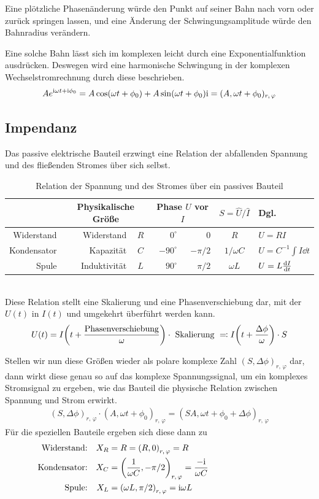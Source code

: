 Eine plötzliche Phasenänderung würde den Punkt auf seiner Bahn nach vorn oder zurück springen lassen, und eine Änderung der Schwingungsamplitude würde den Bahnradius verändern.

Eine solche Bahn lässt sich im komplexen leicht durch eine Exponentialfunktion
ausdrücken. Deswegen wird eine harmonische Schwingung in der komplexen Wechselstromrechnung durch diese beschrieben.
$$A e^{\mathrm{i} \omega t + \mathrm{i} \phi_0} = A\cos(\omega t + \phi_0) + A\sin(\omega t + \phi_0)\mathrm{i} = (A,\omega t + \phi_0)_{r,\,\varphi}$$

\subsection{Impendanz}
Das passive elektrische Bauteil erzwingt eine Relation der abfallenden Spannung und des fließenden Stromes über sich selbst.
\begin{table}[h]
    \centering
    \begin{tabular}{rrcrrcl}
    \toprule 
     & \multicolumn{2}{c}{Physikalische Größe} & \multicolumn{2}{c}{Phase $U$ vor $I$} & $S = \hat{U}/\hat{I}$ & Dgl.\\
    \midrule
    Widerstand  & Widerstand    & $R$ & $0^\circ$   & $0$      & $R$              & $U = RI$ \\
    Kondensator & Kapazität     & $C$ & $-90^\circ$ & $-\pi/2$ & $1/\omega C$     & $U = C^{-1} \int I \dd{t}$ \\
    Spule       & Induktivität  & $L$ & $90^\circ$  & $\pi/2$  & $\omega L$       & $U = L \dv{I}{t}$ \\
    \bottomrule
    \end{tabular}
    \caption{Relation der Spannung und des Stromes über ein passives Bauteil}
\end{table}\\ 
Diese Relation stellt eine Skalierung und eine Phasenverschiebung dar, mit der $U(t)$ in $I(t)$ 
und umgekehrt überführt werden kann.
$$U(t) = I\qty(t + \frac{\text{Phasenverschiebung}}{\omega}) \cdot \text{ Skalierung } \eqqcolon I\qty(t + \frac{\Delta \phi}{\omega}) \cdot S$$

Stellen wir nun diese Größen wieder als polare komplexe Zahl $(S,\Delta \phi)_{r,\,\varphi}$ dar, dann wirkt diese genau so auf das komplexe Spannungssignal, um ein komplexes Stromsignal zu ergeben, wie das Bauteil die physische Relation zwischen Spannung und Strom erwirkt.
\begin{align*}
    (S,\Delta \phi)_{r,\,\varphi} \cdot (A,\omega t + \phi_0)_{r,\,\varphi} = (SA,\omega t + \phi_0 + \Delta \phi)_{r,\,\varphi}
\end{align*}
Für die speziellen Bauteile ergeben sich diese dann zu
\begin{align*}
    \text{Widerstand:} && X_R &= R = \qty(R,0)_{r,\,\varphi} = R \\
    \text{Kondensator:} && X_C &= \qty(\frac{1}{\omega C},-\pi/2)_{r,\,\varphi} = \frac{-\imu}{\omega C}\\
    \text{Spule:} && X_L &= \qty(\omega L,\pi/2)_{r,\,\varphi} = \imu \omega L \phantom{\hspace*{3cm}fff}
\end{align*}

